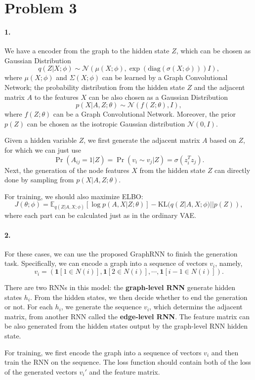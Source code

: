 \documentclass[a4 paper,12pt]{article}
\newcommand*{\E}[0]{\mathbb{E}}\newcommand*{\p}[0]{\mathbb{P}}
\begin{document}
\section*{Problem 3}
\paragraph*{1.}
We have a encoder from the graph to the hidden state $Z$, which can be chosen as Gaussian Distribution
\[
q(Z|X;\phi)\sim \mathcal{N}(\mu(X;\phi),\exp (\text{diag}(\sigma(X;\phi)))I),
\]
where $\mu(X;\phi)$ and $\Sigma(X;\phi)$ can be learned by a Graph Convolutional Network; the probability distribution from the hidden state $Z$ and the adjacent matrix $A$ to the features $X$ can be also chosen as a Gaussian Distribution 
\[
p(X|A,Z;\theta)\sim \mathcal{N}(f(Z;\theta),I),
\]
where $f(Z;\theta)$ can be a Graph Convolutional Network. Moreover, the prior $p(Z)$ can be chosen as the isotropic Gaussian distribution $\mathcal{N}(0,I)$. 

Given a hidden variable $Z$, we first generate the adjacent matrix $A$ based on $Z$, for which we can just use
\[
\Pr(A_{ij}=1|Z)=\Pr(v_i\sim v_j|Z)=\sigma(z_i^Tz_j).
\]
Next, the generation of the node features $X$ from the hidden state $Z$ can directly done by sampling from $p(X|A,Z;\theta)$.

For training, we should also maximize ELBO:
\[
J(\theta;\phi)=\E_{q(Z|A,X;\phi)}[\log p(A,X|Z;\theta)]-\text{KL}(q(Z|A,X;\phi)||p(Z)),
\] where each part can be calculated just as in the ordinary VAE.

\paragraph*{2.}

For these cases, we can use the proposed GraphRNN to finish the generation task. Specifically, we can encode a graph into a sequence of vectors $v_i$, namely,
\[
v_i=(\mathbf{1}[1\in N(i)],\mathbf{1}[2\in N(i)],\cdots,\mathbf{1}[{i-1}\in N(i)]).
\]

There are two RNNs in this model: the \textbf{graph-level RNN} generate hidden states $h_i$. From the hidden states, we then decide whether to end the generation or not. For each $h_i$, we generate the sequence $v_i$, which determins the adjacent matrix, from another RNN called the \textbf{edge-level RNN}. The feature matrix can be also generated from the hidden states output by the {graph-level RNN} hidden state.

For training, we first encode the graph into a sequence of vectors $v_i$ and then train the RNN on the sequence. The loss function should contain both of the loss of the generated vectors $v_i'$ and the feature matrix.



\end{document}
